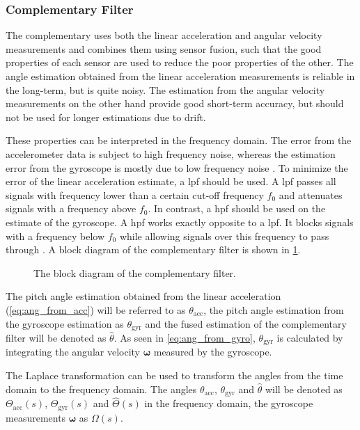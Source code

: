 \subsubsection{Complementary Filter}
The complementary uses both the linear acceleration and angular velocity measurements and combines them using sensor fusion, such that the good properties of each sensor are used to reduce the poor properties of the other.
The angle estimation obtained from the linear acceleration measurements is reliable in the long-term, but is quite noisy.
The estimation from the angular velocity measurements on the other hand provide good short-term accuracy, but should not be used for longer estimations due to drift.\par
These properties can be interpreted in the frequency domain.
The error from the accelerometer data is subject to high frequency noise, whereas the estimation error from the gyroscope is mostly due to low frequency noise \cite{2007Colton}.
To minimize the error of the linear acceleration estimate, a \gls{lpf} should be used.
A \gls{lpf} passes all signals with frequency lower than a certain cut-off frequency $f_0$ and attenuates signals with a frequency above $f_0$.
In contrast, a \gls{hpf} should be used on the estimate of the gyroscope.
A \gls{hpf} works exactly opposite to a \gls{lpf}.
It blocks signals with a frequency below $f_0$ while allowing signals over this frequency to pass through \cite{Lyons1996}. A block diagram of the complementary filter is shown in \cref{fig:tikz_complementary_filter}.\par
\begin{figure}[htb]
	\centering
	
	\caption[Block diagram of the complementary filter]{The block diagram of the complementary filter.}
	\label{fig:tikz_complementary_filter}
\end{figure}
The pitch angle estimation obtained from the linear acceleration (\cref{eq:ang_from_acc}) will be referred to as $\theta_\mathrm{acc}$, the pitch angle estimation from the gyroscope estimation as $\theta_\mathrm{gyr}$ and the fused estimation of the complementary filter will be denoted as $\hat{\theta}$.
As seen in \cref{eq:ang_from_gyro}, $\theta_\mathrm{gyr}$ is calculated by integrating the angular velocity $\boldsymbol{\omega} $ measured by the gyroscope.\par
The Laplace transformation can be used to transform the angles from the time domain to the frequency domain.
The angles $\theta_\mathrm{acc}$, $\theta_\mathrm{gyr}$ and $\hat{\theta}$ will be denoted as $\Theta_\mathrm{acc}(s)$, $\Theta_\mathrm{gyr}(s)$ and $\hat{\Theta}(s)$ in the frequency domain, the gyroscope measurements $\boldsymbol{\omega} $ as $\Omega (s)$.
